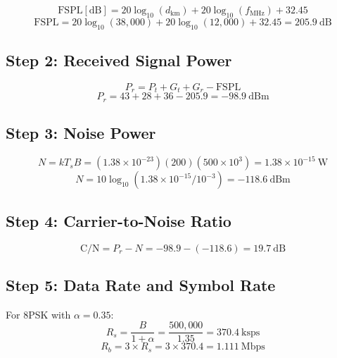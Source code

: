 \begin{equation}
\mathrm{FSPL}[\mathrm{dB}] = 20\log_{10}(d_{\mathrm{km}}) + 20\log_{10}(f_{\mathrm{MHz}}) + 32.45
\end{equation}
\begin{equation}
\mathrm{FSPL} = 20\log_{10}(38{,}000) + 20\log_{10}(12{,}000) + 32.45 = 205.9~\mathrm{dB}
\end{equation}

\subsection*{Step 2: Received Signal Power}

\begin{equation}
P_r = P_t + G_t + G_r - \mathrm{FSPL}
\end{equation}
\begin{equation}
P_r = 43 + 28 + 36 - 205.9 = -98.9~\mathrm{dBm}
\end{equation}

\subsection*{Step 3: Noise Power}

\begin{equation}
N = kT_sB = (1.38 \times 10^{-23})(200)(500 \times 10^3) = 1.38 \times 10^{-15}~\mathrm{W}
\end{equation}
\begin{equation}
N = 10\log_{10}(1.38 \times 10^{-15}/10^{-3}) = -118.6~\mathrm{dBm}
\end{equation}

\subsection*{Step 4: Carrier-to-Noise Ratio}

\begin{equation}
\mathrm{C/N} = P_r - N = -98.9 - (-118.6) = 19.7~\mathrm{dB}
\end{equation}

\subsection*{Step 5: Data Rate and Symbol Rate}

For 8PSK with $\alpha = 0.35$:
\begin{equation}
R_s = \frac{B}{1 + \alpha} = \frac{500{,}000}{1.35} = 370.4~\mathrm{ksps}
\end{equation}
\begin{equation}
R_b = 3 \times R_s = 3 \times 370.4 = 1.111~\mathrm{Mbps}
\end{equation}

